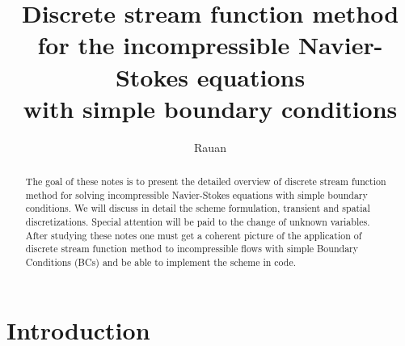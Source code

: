 \documentclass{article}
\title{Discrete stream function method \\ for the incompressible Navier-Stokes equations \\with simple boundary conditions}
\author{Rauan}
\numberwithin{equation}{section}
\begin{document}
\maketitle

\begin{abstract}
The goal of these notes is to present the detailed overview of discrete stream function method for solving incompressible Navier-Stokes equations with simple boundary conditions. We will discuss in detail the scheme formulation, transient and spatial discretizations. Special attention will be paid to the change of unknown variables. After studying these notes one must get a coherent picture of the application of discrete stream function method to incompressible flows with simple Boundary Conditions (BCs) and be able to implement the scheme in code.
\end{abstract}

\tableofcontents

\section{Introduction}\label{sec:introduction}
\end{document}
